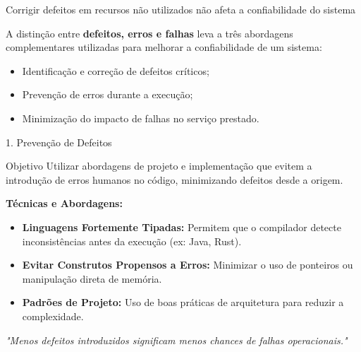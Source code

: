 \documentclass[9pt]{beamer}
\begin{document}
\begin{frame}{Corrigir defeitos em recursos não utilizados não afeta a confiabilidade do sistema}
\centering
\vspace{0.5cm}

\Large

\vspace{0.5cm}

\small
A distinção entre \textbf{defeitos, erros e falhas} leva a três abordagens complementares utilizadas para melhorar a confiabilidade de um sistema:
\vspace{0.5cm}

\begin{itemize}
    \item Identificação e correção de defeitos críticos;
    \item Prevenção de erros durante a execução;
    \item Minimização do impacto de falhas no serviço prestado.
\end{itemize}

\end{frame}
\begin{frame}{1. Prevenção de Defeitos}
  \begin{block}{Objetivo}
    Utilizar abordagens de projeto e implementação que evitem a introdução de erros humanos no código, minimizando defeitos desde a origem.
  \end{block}

  \textbf{Técnicas e Abordagens:}
  \begin{itemize}
    \item \textbf{Linguagens Fortemente Tipadas:} Permitem que o compilador detecte inconsistências antes da execução (ex: Java, Rust).
    \item \textbf{Evitar Construtos Propensos a Erros:} Minimizar o uso de ponteiros ou manipulação direta de memória.
    \item \textbf{Padrões de Projeto:} Uso de boas práticas de arquitetura para reduzir a complexidade.
  \end{itemize}
  
  \textit{"Menos defeitos introduzidos significam menos chances de falhas operacionais."}
\end{frame}
\end{document}
